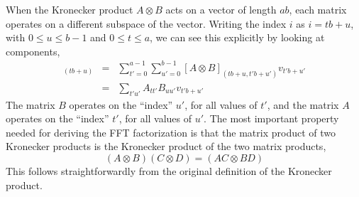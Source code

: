 \documentclass[fleqn,12pt]{article}
\begin{document}
%
When the Kronecker product $A \otimes B$ acts on a vector of length
$ab$, each matrix operates on a different subspace of the vector.
Writing the index $i$ as $i=t b + u$, with $0\leq u \leq b-1$
and $0\leq t\leq a$, we can see this explicitly by looking at components,
%
\begin{eqnarray}
[(A \otimes B) v]_{(tb+u)}
& = & \sum_{t'=0}^{a-1} \sum_{u'=0}^{b-1} 
        [A \otimes B]_{(tb+u,t'b+u')} v_{t'b+u'} \\
& = & \sum_{t'u'} A_{tt'} B_{uu'} v_{t'b+u'} 
\end{eqnarray}
%
The matrix $B$ operates on the ``index'' $u'$, for all values of $t'$, and
the matrix $A$ operates on the ``index'' $t'$, for all values of $u'$.
%
The most important property needed for deriving the FFT factorization
is that the matrix product of two Kronecker products is the Kronecker
product of the two matrix products,
%
\begin{equation}
(A \otimes B)(C \otimes D) = (AC \otimes BD)
\end{equation}
%
This follows straightforwardly from the original definition of the
Kronecker product.
\end{document}
